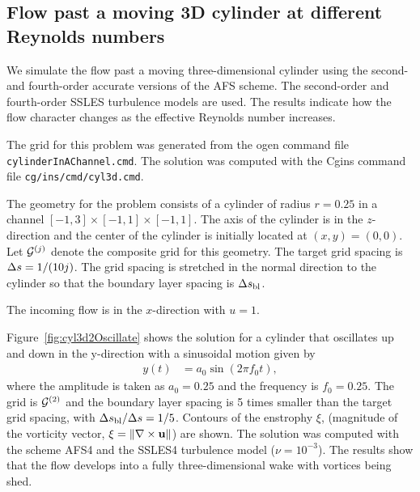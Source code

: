 \clearpage
\subsection{Flow past a moving 3D cylinder at different Reynolds numbers}\label{sec:oscillatingCyl3d}


We simulate the flow past a moving three-dimensional cylinder using the second- and
fourth-order accurate versions of the AFS scheme.  The second-order and
fourth-order SSLES turbulence models are used. The results indicate how the flow
character changes as the effective Reynolds number increases.

The grid for this problem was generated from the ogen command file {\tt cylinderInAChannel.cmd}.
The solution was computed with the Cgins command file {\tt cg/ins/cmd/cyl3d.cmd}.

The geometry for the problem consists of a cylinder of radius $r=0.25$ in a channel $[-1,3]\times[-1,1]\times[-1,1]$. 
The axis of the cylinder is
in the $z$-direction and the center of the cylinder is initially located at $(x,y)=(0,0)$. 
Let ${\mathcal G}^{(j)}$ denote the composite grid for this geometry. The target grid spacing is $\Delta s=1/(10 j)$.
The grid spacing is stretched in the normal direction to the cylinder so that the boundary layer
spacing is $\Delta s_{\rm bl}$. 


The incoming flow is in the $x$-direction with $u=1$.


Figure~\ref{fig:cyl3d2Oscillate} shows the solution for a cylinder that oscillates up and down
in the y-direction with a sinusoidal motion given by 
\begin{align*}
   y(t) &= a_0 \sin( 2\pi f_0 t) ,
\end{align*}
where the amplitude is taken as $a_0=0.25$ and the frequency is $f_0=0.25$.
The grid is ${\mathcal G}^{(2)}$ and the boundary layer spacing is 5 times smaller than the target grid spacing, with $\Delta s_{\rm bl}/\Delta s=1/5$.
Contours of the enstrophy $\xi$, (magnitude of the vorticity vector, $\xi=\| \nabla\times \mathbf{ u}\|$) are shown.
The solution was computed with the scheme AFS4 and the SSLES4 turbulence model ($\nu=10^{-3}$). 
The results show that the flow develops into a fully three-dimensional wake with vortices being shed.


